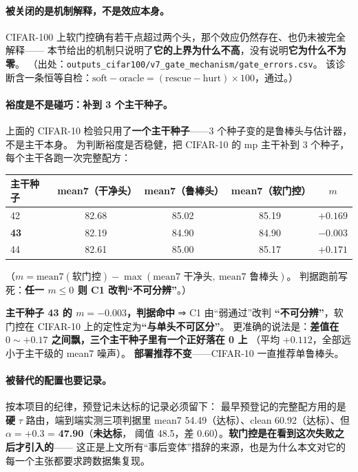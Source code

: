 \documentclass[11pt,a4paper]{ctexart}
\begin{document}
\paragraph{被关闭的是机制解释，不是效应本身。}
CIFAR-100 上软门控确有若干点超过两个头，那个效应仍然存在、也仍未被完全解释——
本节给出的机制只说明了\textbf{它的上界为什么不高}，没有说明\textbf{它为什么不为零}。
（出处：\texttt{outputs\_cifar100/v7\_gate\_mechanism/gate\_errors.csv}。
该诊断含一条恒等自检：$\text{soft}-\text{oracle}=(\text{rescue}-\text{hurt})\times100$，通过。）

\paragraph{裕度是不是碰巧：补到 3 个主干种子。}
上面的 CIFAR-10 检验只用了\textbf{一个主干种子}——3 个种子变的是鲁棒头与估计器，不是主干本身。
为判断裕度是否稳健，把 CIFAR-10 的 mp 主干补到 3 个种子，每个主干各跑一次完整配方：

\begin{center}
\small
\begin{tabular}{lcccc}
\toprule
主干种子 & mean7（干净头） & mean7（鲁棒头） & mean7（软门控） & $m$ \\
\midrule
42 & 82.68 & 85.02 & 85.19 & $+0.169$ \\
\textbf{43} & 82.19 & 84.90 & 84.90 & $\bm{-0.003}$ \\
44 & 82.61 & 85.00 & 85.17 & $+0.171$ \\
\bottomrule
\end{tabular}
\end{center}

（$m=\text{mean7}(\text{软门控})-\max(\text{mean7 干净头},\ \text{mean7 鲁棒头})$。
判据跑前写死：\textbf{任一 $m\le0$ 则 C1 改判“不可分辨”}。）

\textbf{主干种子 43 的 $m=-0.003$，判据命中} ⇒ C1 由“弱通过”改判
\textbf{“不可分辨”}，软门控在 CIFAR-10 上的定性定为\textbf{“与单头不可区分”}。
更准确的说法是：\textbf{差值在 $0\sim+0.17$ 之间飘，三个主干种子里有一个正好落在 0 上}
（平均 $+0.112$，全部远小于主干级的 mean7 噪声）。
\textbf{部署推荐不变}——CIFAR-10 一直推荐单鲁棒头。

\paragraph{被替代的配置也要记录。}
按本项目的纪律，预登记未达标的记录必须留下：
最早预登记的完整配方用的是\textbf{硬} $\tau$ 路由，端到端实测三项判据里
mean7 54.49（达标）、clean 60.92（达标）、但 $\alpha=+0.3$ = \textbf{47.90}（\textbf{未达标}，
阈值 48.5，差 0.60）。\textbf{软门控是在看到这次失败之后才引入的}——
这正是上文所有“事后变体”措辞的来源，也是为什么本文对它的每一个主张都要求跨数据集复现。
\end{document}
